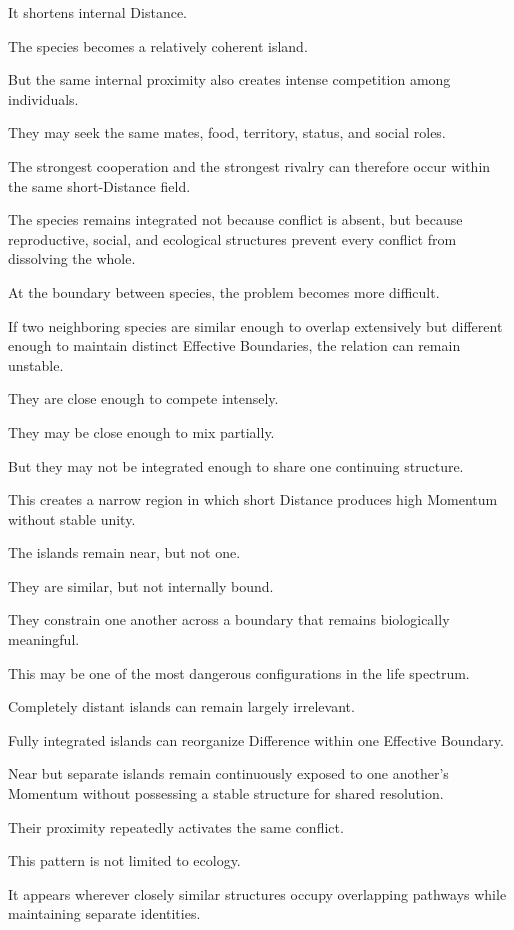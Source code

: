 It shortens internal Distance.

The species becomes a relatively coherent island.

But the same internal proximity also creates intense competition among individuals.

They may seek the same mates, food, territory, status, and social roles.

The strongest cooperation and the strongest rivalry can therefore occur within the same short-Distance field.

The species remains integrated not because conflict is absent, but because reproductive, social, and ecological structures prevent every conflict from dissolving the whole.

At the boundary between species, the problem becomes more difficult.

If two neighboring species are similar enough to overlap extensively but different enough to maintain distinct Effective Boundaries, the relation can remain unstable.

They are close enough to compete intensely.

They may be close enough to mix partially.

But they may not be integrated enough to share one continuing structure.

This creates a narrow region in which short Distance produces high Momentum without stable unity.

The islands remain near, but not one.

They are similar, but not internally bound.

They constrain one another across a boundary that remains biologically meaningful.

This may be one of the most dangerous configurations in the life spectrum.

Completely distant islands can remain largely irrelevant.

Fully integrated islands can reorganize Difference within one Effective Boundary.

Near but separate islands remain continuously exposed to one another’s Momentum without possessing a stable structure for shared resolution.

Their proximity repeatedly activates the same conflict.

This pattern is not limited to ecology.

It appears wherever closely similar structures occupy overlapping pathways while maintaining separate identities.

